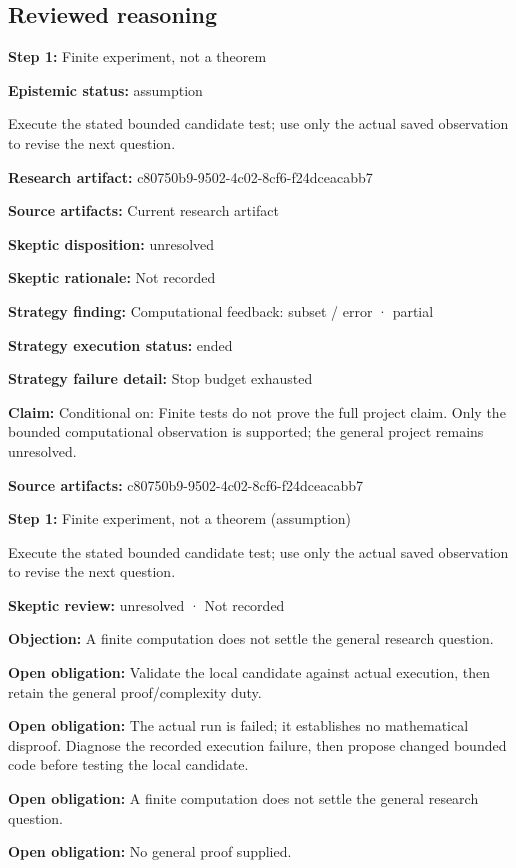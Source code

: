 \documentclass[11pt]{article}
\begin{document}
\subsection{Reviewed reasoning}
\textbf{Step 1:} Finite experiment, not a theorem\par
\textbf{Epistemic status:} assumption\par
Execute the stated bounded candidate test; use only the actual saved observation to revise the next question.\par
\textbf{Research artifact:} c80750b9-9502-4c02-8cf6-f24dceacabb7\par
\textbf{Source artifacts:} Current research artifact\par
\textbf{Skeptic disposition:} unresolved\par
\textbf{Skeptic rationale:} Not recorded\par
\textbf{Strategy finding:} Computational feedback: subset / error · partial\par
\textbf{Strategy execution status:} ended\par
\textbf{Strategy failure detail:} Stop budget exhausted\par
\textbf{Claim:} Conditional on: Finite tests do not prove the full project claim. Only the bounded computational observation is supported; the general project remains unresolved.\par
\textbf{Source artifacts:} c80750b9-9502-4c02-8cf6-f24dceacabb7\par
\textbf{Step 1:} Finite experiment, not a theorem (assumption)\par
Execute the stated bounded candidate test; use only the actual saved observation to revise the next question.\par
\textbf{Skeptic review:} unresolved · Not recorded\par
\textbf{Objection:} A finite computation does not settle the general research question.\par
\textbf{Open obligation:} Validate the local candidate against actual execution, then retain the general proof/complexity duty.\par
\textbf{Open obligation:} The actual run is failed; it establishes no mathematical disproof. Diagnose the recorded execution failure, then propose changed bounded code before testing the local candidate.\par
\textbf{Open obligation:} A finite computation does not settle the general research question.\par
\textbf{Open obligation:} No general proof supplied.\par
\end{document}

